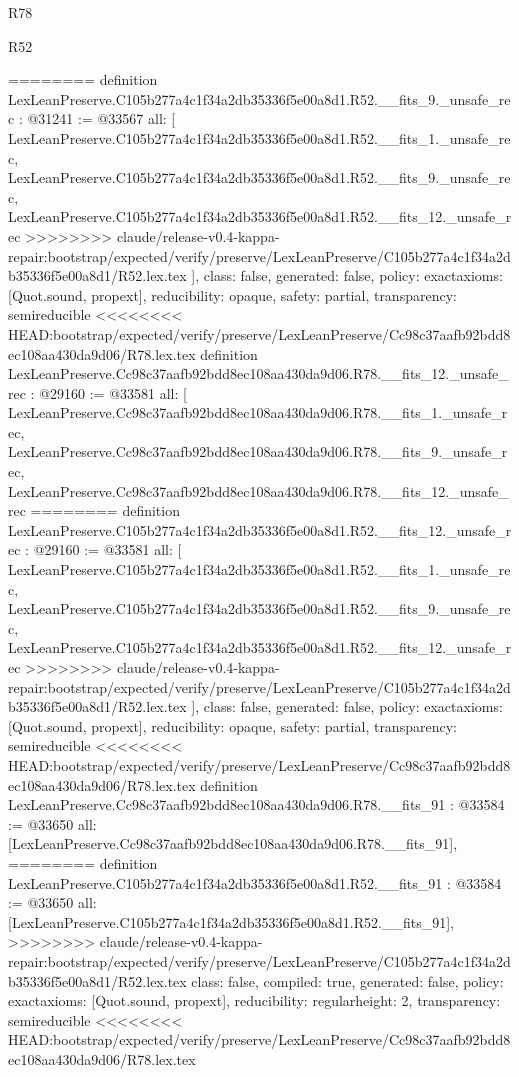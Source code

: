 \begin{lexlean}{R78}
\begin{lexlean}{R52}
\begin{coremodule}
{{{{{{{{{{{{{{{{{{{{{{{{{{{{{{{{{{{{{{{{{{{{{{{{{{{{{{{{{{{{{{{{{{{{{{{{{{{{{{{{{{{{{{{{{{{{{{{{{{{{{{{{{{{{{{{{{{{{{{{{{{{{{{{{{{{{{{{{{{{{{{{{{{{{{{{{{{{{========
definition LexLeanPreserve.C105b277a4c1f34a2db35336f5e00a8d1.R52.__fits_9._unsafe_rec : @31241 := @33567 {
  all: [
    LexLeanPreserve.C105b277a4c1f34a2db35336f5e00a8d1.R52.__fits_1._unsafe_rec,
    LexLeanPreserve.C105b277a4c1f34a2db35336f5e00a8d1.R52.__fits_9._unsafe_rec,
    LexLeanPreserve.C105b277a4c1f34a2db35336f5e00a8d1.R52.__fits_12._unsafe_rec
>>>>>>>> claude/release-v0.4-kappa-repair:bootstrap/expected/verify/preserve/LexLeanPreserve/C105b277a4c1f34a2db35336f5e00a8d1/R52.lex.tex
  ],
  class: false,
  generated: false,
  policy: exact{axioms: [Quot.sound, propext]},
  reducibility: opaque{},
  safety: partial,
  transparency: semireducible
}
<<<<<<<< HEAD:bootstrap/expected/verify/preserve/LexLeanPreserve/Cc98c37aafb92bdd8ec108aa430da9d06/R78.lex.tex
definition LexLeanPreserve.Cc98c37aafb92bdd8ec108aa430da9d06.R78.__fits_12._unsafe_rec : @29160 := @33581 {
  all: [
    LexLeanPreserve.Cc98c37aafb92bdd8ec108aa430da9d06.R78.__fits_1._unsafe_rec,
    LexLeanPreserve.Cc98c37aafb92bdd8ec108aa430da9d06.R78.__fits_9._unsafe_rec,
    LexLeanPreserve.Cc98c37aafb92bdd8ec108aa430da9d06.R78.__fits_12._unsafe_rec
========
definition LexLeanPreserve.C105b277a4c1f34a2db35336f5e00a8d1.R52.__fits_12._unsafe_rec : @29160 := @33581 {
  all: [
    LexLeanPreserve.C105b277a4c1f34a2db35336f5e00a8d1.R52.__fits_1._unsafe_rec,
    LexLeanPreserve.C105b277a4c1f34a2db35336f5e00a8d1.R52.__fits_9._unsafe_rec,
    LexLeanPreserve.C105b277a4c1f34a2db35336f5e00a8d1.R52.__fits_12._unsafe_rec
>>>>>>>> claude/release-v0.4-kappa-repair:bootstrap/expected/verify/preserve/LexLeanPreserve/C105b277a4c1f34a2db35336f5e00a8d1/R52.lex.tex
  ],
  class: false,
  generated: false,
  policy: exact{axioms: [Quot.sound, propext]},
  reducibility: opaque{},
  safety: partial,
  transparency: semireducible
}
<<<<<<<< HEAD:bootstrap/expected/verify/preserve/LexLeanPreserve/Cc98c37aafb92bdd8ec108aa430da9d06/R78.lex.tex
definition LexLeanPreserve.Cc98c37aafb92bdd8ec108aa430da9d06.R78.__fits_91 : @33584 := @33650 {
  all: [LexLeanPreserve.Cc98c37aafb92bdd8ec108aa430da9d06.R78.__fits_91],
========
definition LexLeanPreserve.C105b277a4c1f34a2db35336f5e00a8d1.R52.__fits_91 : @33584 := @33650 {
  all: [LexLeanPreserve.C105b277a4c1f34a2db35336f5e00a8d1.R52.__fits_91],
>>>>>>>> claude/release-v0.4-kappa-repair:bootstrap/expected/verify/preserve/LexLeanPreserve/C105b277a4c1f34a2db35336f5e00a8d1/R52.lex.tex
  class: false,
  compiled: true,
  generated: false,
  policy: exact{axioms: [Quot.sound, propext]},
  reducibility: regular{height: 2},
  transparency: semireducible
}
<<<<<<<< HEAD:bootstrap/expected/verify/preserve/LexLeanPreserve/Cc98c37aafb92bdd8ec108aa430da9d06/R78.lex.tex
}}}}}}}}}}}}}}}}}}}}}}}}}}}}}}}}}}}}}}}}}}}}}}}}}}}}}}}}}}}}}}}}}}}}}}}}}}}}}}}}}}}}}}}}}}}}}}}}}}}}}}}}}}}}}}}}}}}}}}}}}}}}}}}}}}}}}}}}}}}}}}}}}}}}}}}}}}}}}}
\end{coremodule}
\end{lexlean}
\end{lexlean}

